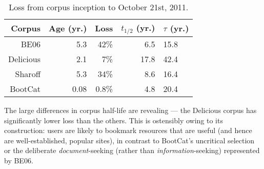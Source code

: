 


\begin{table}[h*tb]
    \centering
    \begin{tabular}{r | r | r | r | l}
	  Corpus & Age (yr.) & Loss & $t_{1/2}$ (yr.) & $\tau$ (yr.) \\
	\hline 
	
	BE06       & 5.3  & 42\%    & 6.5	& 15.8\\
	Delicious  & 2.1  & 7\%	    & 17.8 & 42.4\\
	Sharoff    & 5.3  & 34\%    & 8.6  & 16.4\\
	BootCat    & 0.08 & 0.8\%   & 4.8  & 20.4\\
    \end{tabular}

    \caption{Loss from corpus inception to October 21st, 2011.}
    \label{table:longitudinal:attrition-inputdist}
\end{table}

The large differences in corpus half-life are revealing --- the Delicious corpus has significantly lower loss than the others.  This is ostensibly owing to its construction: users are likely to bookmark resources that are useful (and hence are well-established, popular sites), in contrast to BootCat's uncritical selection or the deliberate \textsl{document}-seeking (rather than \textsl{information}-seeking) represented by BE06.



